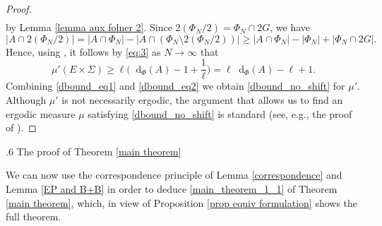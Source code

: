 \documentclass[reqno]{amsart}
\makeatletter
\newcommand*\diff{\mathop{}\!\mathrm{d}}
\theoremstyle{definition}
\theoremstyle{remark}
\def\subsection{\@startsection{subsection}{2}%
  \z@{.4\linespacing\@plus.7\linespacing}
{.6\baselineskip}%
  {\normalfont\centering\bfseries}%
}
\theoremstyle{remark}
\makeatother
\begin{document}
\begin{proof}
\begin{align}
\end{align}
by Lemma \ref{lemma aux folner 2}. Since $2(\Phi_N/2)=\Phi_N \cap 2G$, we have 
$$|A\cap 2(\Phi_{N}/2)|=|A\cap \Phi_N|-|A\cap (\Phi_N\setminus 2(\Phi_N/2))| \geq |A\cap \Phi_N|-|\Phi_N|+| \Phi_N\cap 2G|.$$
Hence, using \cite[Lemma 5.4]{Charamaras_Mountakis_2025}, it 
follows by \eqref{eq:3} as $N\to \infty$ that
\begin{equation}\label{dbound_eq2}
    \mu'(E\times\Sigma) 
    \geq \ell \bigg(\diff_\Phi(A) - 1 + 
    \frac{1}{\ell}\bigg)
    = \ell \diff_\Phi(A) - \ell + 1.
\end{equation}
Combining \eqref{dbound_eq1} and \eqref{dbound_eq2} 
we obtain \eqref{dbound_no_shift} for $\mu'$. 
Although $\mu'$ is not necessarily ergodic, the argument that allows us to find an ergodic measure $\mu$ satisfying \eqref{dbound_no_shift} is standard (see, e.g., the proof of \cite[Lemma 2.4]{charamaras_kousek_mountakis_radic2025BBingroups}). 
\end{proof}

\subsection{The proof of Theorem \ref{main theorem}}

We can now use the correspondence principle of Lemma 
\ref{correspondence} and Lemma \ref{EP and B+B} in order to
deduce \eqref{main_theorem_1_1} of Theorem \ref{main theorem}, which, in view of Proposition \ref{prop equiv formulation} shows the full theorem. 
\end{document}
